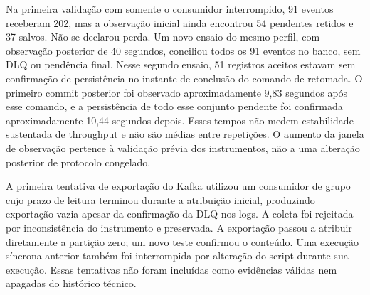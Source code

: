 Na primeira validação com somente o consumidor interrompido, 91 eventos receberam 202, mas a observação inicial ainda encontrou 54 pendentes retidos e 37 salvos. Não se declarou perda. Um novo ensaio do mesmo perfil, com observação posterior de 40 segundos, conciliou todos os 91 eventos no banco, sem DLQ ou pendência final. Nesse segundo ensaio, 51 registros aceitos estavam sem confirmação de persistência no instante de conclusão do comando de retomada. O primeiro commit posterior foi observado aproximadamente 9,83 segundos após esse comando, e a persistência de todo esse conjunto pendente foi confirmada aproximadamente 10,44 segundos depois. Esses tempos não medem estabilidade sustentada de throughput e não são médias entre repetições. O aumento da janela de observação pertence à validação prévia dos instrumentos, não a uma alteração posterior de protocolo congelado.

A primeira tentativa de exportação do Kafka utilizou um consumidor de grupo cujo prazo de leitura terminou durante a atribuição inicial, produzindo exportação vazia apesar da confirmação da DLQ nos logs. A coleta foi rejeitada por inconsistência do instrumento e preservada. A exportação passou a atribuir diretamente a partição zero; um novo teste confirmou o conteúdo. Uma execução síncrona anterior também foi interrompida por alteração do script durante sua execução. Essas tentativas não foram incluídas como evidências válidas nem apagadas do histórico técnico.
